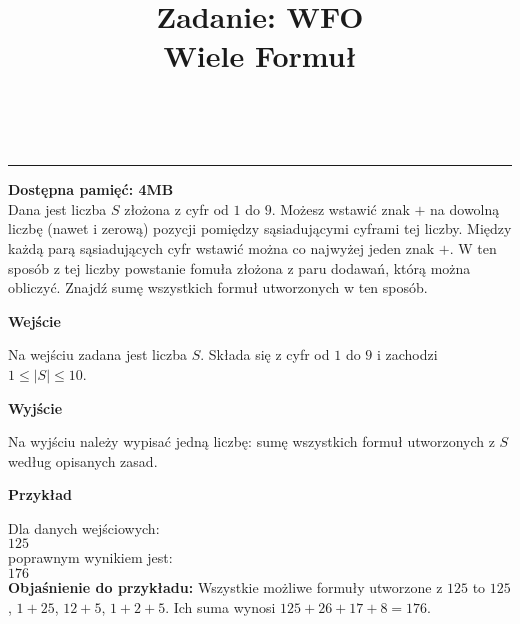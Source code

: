 \documentclass{article}
\makeatletter
\renewcommand{\maketitle}{\bgroup\setlength{\parindent}{0pt}
	\textbf{\@title}\egroup
	\\
}
\makeatother
\begin{document}
	\title{\large Zadanie: WFO \\ Wiele Formuł}\maketitle
	\centering \rule{18cm}{0.5pt} \justifying
	\textbf{Dostępna pamięć: 4MB} \\
	
	Dana jest liczba $S$ złożona z cyfr od $1$ do $9$. Możesz wstawić znak $+$ na dowolną liczbę (nawet i zerową) pozycji pomiędzy sąsiadującymi cyframi tej liczby. Między każdą parą sąsiadujących cyfr wstawić można co najwyżej jeden znak $+$. W ten sposób z tej liczby powstanie fomuła złożona z paru dodawań, którą można obliczyć.
	\smallbreak
	Znajdź sumę wszystkich formuł utworzonych w ten sposób.
	\begin{flushleft}
		\LARGE \textbf{Wejście}
	\end{flushleft}
	\smallbreak
	
	Na wejściu zadana jest liczba $S$. Składa się z cyfr od $1$ do $9$ i zachodzi $1 \leq |S| \leq 10$.
	\begin{flushleft}
		\LARGE \textbf{Wyjście}
	\end{flushleft}
	\smallbreak
	
	Na wyjściu należy wypisać jedną liczbę: sumę wszystkich formuł utworzonych z $S$ według opisanych zasad.
	\begin{flushleft}
		\LARGE \textbf{Przykład}
	\end{flushleft}
	\smallskip 
	Dla danych wejściowych: \\
	$125$
	\smallskip \\
	poprawnym wynikiem jest: \\
	$176$
	\smallskip \\
	\textbf{Objaśnienie do przykładu:} Wszystkie możliwe formuły utworzone z $125$ to $125$, $1+25$, $12+5$, $1+2+5$. Ich suma wynosi $125+26+17+8=176$.
\end{document}
